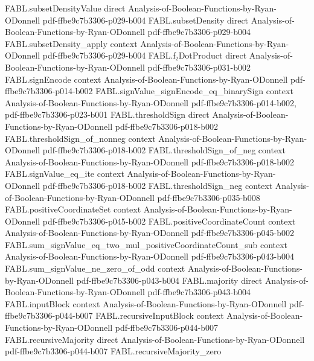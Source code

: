\begin{theorem}
\proofstep
  {FABL.subsetDensityValue}
  {direct}
  {Analysis-of-Boolean-Functions-by-Ryan-ODonnell}
  {pdf-ffbe9c7b3306-p029-b004}
\proofstep
  {FABL.subsetDensity}
  {direct}
  {Analysis-of-Boolean-Functions-by-Ryan-ODonnell}
  {pdf-ffbe9c7b3306-p029-b004}
\proofstep
  {FABL.subsetDensity_apply}
  {context}
  {Analysis-of-Boolean-Functions-by-Ryan-ODonnell}
  {pdf-ffbe9c7b3306-p029-b004}
\proofstep
  {FABL.f₂DotProduct}
  {direct}
  {Analysis-of-Boolean-Functions-by-Ryan-ODonnell}
  {pdf-ffbe9c7b3306-p031-b002}
\proofstep
  {FABL.signEncode}
  {context}
  {Analysis-of-Boolean-Functions-by-Ryan-ODonnell}
  {pdf-ffbe9c7b3306-p014-b002}
\proofstep
  {FABL.signValue_signEncode_eq_binarySign}
  {context}
  {Analysis-of-Boolean-Functions-by-Ryan-ODonnell}
  {pdf-ffbe9c7b3306-p014-b002,
    pdf-ffbe9c7b3306-p023-b001}
\proofstep
  {FABL.thresholdSign}
  {direct}
  {Analysis-of-Boolean-Functions-by-Ryan-ODonnell}
  {pdf-ffbe9c7b3306-p018-b002}
\proofstep
  {FABL.thresholdSign_of_nonneg}
  {context}
  {Analysis-of-Boolean-Functions-by-Ryan-ODonnell}
  {pdf-ffbe9c7b3306-p018-b002}
\proofstep
  {FABL.thresholdSign_of_neg}
  {context}
  {Analysis-of-Boolean-Functions-by-Ryan-ODonnell}
  {pdf-ffbe9c7b3306-p018-b002}
\proofstep
  {FABL.signValue_eq_ite}
  {context}
  {Analysis-of-Boolean-Functions-by-Ryan-ODonnell}
  {pdf-ffbe9c7b3306-p018-b002}
\proofstep
  {FABL.thresholdSign_neg}
  {context}
  {Analysis-of-Boolean-Functions-by-Ryan-ODonnell}
  {pdf-ffbe9c7b3306-p035-b008}
\proofstep
  {FABL.positiveCoordinateSet}
  {context}
  {Analysis-of-Boolean-Functions-by-Ryan-ODonnell}
  {pdf-ffbe9c7b3306-p045-b002}
\proofstep
  {FABL.positiveCoordinateCount}
  {context}
  {Analysis-of-Boolean-Functions-by-Ryan-ODonnell}
  {pdf-ffbe9c7b3306-p045-b002}
\proofstep
  {FABL.sum_signValue_eq_two_mul_positiveCoordinateCount_sub}
  {context}
  {Analysis-of-Boolean-Functions-by-Ryan-ODonnell}
  {pdf-ffbe9c7b3306-p043-b004}
\proofstep
  {FABL.sum_signValue_ne_zero_of_odd}
  {context}
  {Analysis-of-Boolean-Functions-by-Ryan-ODonnell}
  {pdf-ffbe9c7b3306-p043-b004}
\proofstep
  {FABL.majority}
  {direct}
  {Analysis-of-Boolean-Functions-by-Ryan-ODonnell}
  {pdf-ffbe9c7b3306-p043-b004}
\proofstep
  {FABL.inputBlock}
  {context}
  {Analysis-of-Boolean-Functions-by-Ryan-ODonnell}
  {pdf-ffbe9c7b3306-p044-b007}
\proofstep
  {FABL.recursiveInputBlock}
  {context}
  {Analysis-of-Boolean-Functions-by-Ryan-ODonnell}
  {pdf-ffbe9c7b3306-p044-b007}
\proofstep
  {FABL.recursiveMajority}
  {direct}
  {Analysis-of-Boolean-Functions-by-Ryan-ODonnell}
  {pdf-ffbe9c7b3306-p044-b007}
\proofstep
  {FABL.recursiveMajority_zero}

\end{theorem}
